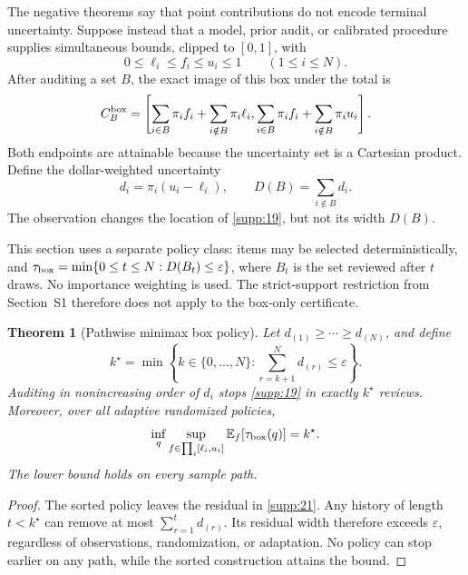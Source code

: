 \documentclass[11pt]{article}
\newtheorem{theorem}{Theorem}
\newcommand{\E}{\mathbb{E}}
\begin{document}
The negative theorems say that point contributions do not encode terminal
uncertainty. Suppose instead that a model, prior audit, or calibrated procedure
supplies simultaneous bounds, clipped to $[0,1]$, with
\begin{equation}\label{supp:18}
 0\le\ell_i\le f_i\le u_i\le1\qquad(1\le i\le N).
\end{equation}
After auditing a set \(B\), the exact image of this box under the total is
\begin{equation}\label{supp:19}
 C_B^{\rm box}=
 \left[
 \sum_{i\in B}\pi_i f_i+\sum_{i\notin B}\pi_i\ell_i,
 \sum_{i\in B}\pi_i f_i+\sum_{i\notin B}\pi_i u_i
 \right].
\end{equation}
Both endpoints are attainable because the uncertainty set is a Cartesian
product. Define the dollar-weighted uncertainty
\begin{equation}\label{supp:20}
 d_i=\pi_i(u_i-\ell_i),\qquad
 D(B)=\sum_{i\notin B}d_i.
\end{equation}
The observation changes the location of \eqref{supp:19}, but not its width \(D(B)\).

This section uses a separate policy class: items may be selected
deterministically, and $\tau_{\rm box}=\min\{0\le t\le N:D(B_t)\le\varepsilon\}$,
where $B_t$ is the set reviewed after $t$ draws. No importance weighting is
used. The strict-support restriction from Section~S1 therefore does not apply
to the box-only certificate.

\begin{theorem}[Pathwise minimax box policy]
Let \(d_{(1)}\ge\cdots\ge d_{(N)}\), and define
\begin{equation}\label{supp:21}
 k^\star=\min\left\{k\in\{0,\ldots,N\}:
 \sum_{r=k+1}^N d_{(r)}\le\varepsilon\right\}.
\end{equation}
Auditing in nonincreasing order of \(d_i\) stops \eqref{supp:19} in exactly
\(k^\star\) reviews. Moreover, over all adaptive randomized policies,
\begin{equation}\label{supp:22}
 \inf_q\sup_{f\in\prod_i[\ell_i,u_i]}
 \E_f[\tau_{\rm box}(q)]=k^\star.
\end{equation}
The lower bound holds on every sample path.
\end{theorem}

\begin{proof}
The sorted policy leaves the residual in \eqref{supp:21}. Any history of length
\(t<k^\star\) can remove at most \(\sum_{r=1}^t d_{(r)}\). Its residual width
therefore exceeds \(\varepsilon\), regardless of observations, randomization,
or adaptation. No policy can stop earlier on any path, while the sorted
construction attains the bound.
\end{proof}
\end{document}
